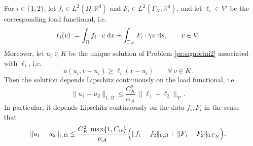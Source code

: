 \begin{proposition}\label{pr:lipschitz}
	For $i\in\{1,2\}$, let $f_i\in L^2(\Omega;\mathbb R^d)$ and $F_i\in L^2(\Gamma_N;\mathbb R^d)$, and let $\ell_i\in V'$ be the corresponding load functional, i.e.
	\begin{equation*}
		\ell_i(v):=\int_\Omega f_i\cdot v\;{{\mathrm{d}} x}+\int_{\Gamma_N} F_i\cdot \gamma v\;{{\mathrm{d}} s},
		\qquad v\in V.
	\end{equation*}
	Moreover, let $u_i\in K$ be the unique solution of Problem \ref{pr:signorini2} associated with $\ell_i$, i.e.
	\begin{equation*}
		a(u_i,v-u_i)\ge \ell_i(v-u_i)\qquad \forall\, v\in K.
	\end{equation*}
	Then the solution depends Lipschitz continuously on the load functional, i.e.
	\begin{equation}\label{eq:lipschitzabstract}
		\|u_1-u_2\|_{1,\Omega}\le \frac{C_K^2}{\alpha_\mathcal{A}}\,\|\ell_1-\ell_2\|_{V'}.
	\end{equation}
	In particular, it depends Lipschitz continuously on the data $f_i,F_i$ in the sense that
	\begin{equation}\label{eq:lipschitzloads}
		\|u_1-u_2\|_{1,\Omega}
		\le \frac{C_K^2\,\max\{1,C_\mathrm{tr}\}}{\alpha_\mathcal{A}}
		\Bigl(\|f_1-f_2\|_{0,\Omega}+\|F_1-F_2\|_{0,\Gamma_N}\Bigr).
	\end{equation}
\end{proposition}

